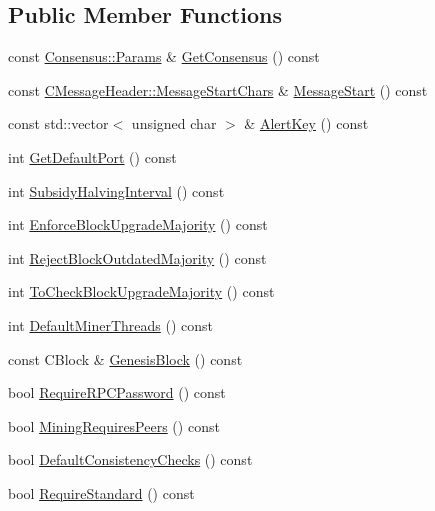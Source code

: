 \subsection*{Public Member Functions}
\begin{DoxyCompactItemize}
\item 
const \hyperlink{chainparams_8h_a5e1ca1b35c3dd1a4e20f18445f28dd9c}{Consensus\+::\+Params} \& \hyperlink{class_c_chain_params_a34b124f87e3b7864fec208ba8879e9e9}{Get\+Consensus} () const 
\item 
const \hyperlink{class_c_message_header_a0d0eeb540cbf4087973f6652ad61878f}{C\+Message\+Header\+::\+Message\+Start\+Chars} \& \hyperlink{class_c_chain_params_ae4f7e42b4fa574aad4e2688f574227da}{Message\+Start} () const 
\item 
const std\+::vector$<$ unsigned char $>$ \& \hyperlink{class_c_chain_params_aec4d2aa83f6fd444f68df1a92140075a}{Alert\+Key} () const 
\item 
int \hyperlink{class_c_chain_params_afdb7793273cdb87cc5fd75450eb2258b}{Get\+Default\+Port} () const 
\item 
int \hyperlink{class_c_chain_params_a22301443ebfa49c61f9a7d75b03a84f2}{Subsidy\+Halving\+Interval} () const 
\item 
int \hyperlink{class_c_chain_params_a11c62c3c053019d7c10034d7690d4311}{Enforce\+Block\+Upgrade\+Majority} () const 
\item 
int \hyperlink{class_c_chain_params_ac30ca8a722c96c7d7894637b409bf32a}{Reject\+Block\+Outdated\+Majority} () const 
\item 
int \hyperlink{class_c_chain_params_ae7c61aab594b025befa97accf28e7324}{To\+Check\+Block\+Upgrade\+Majority} () const 
\item 
int \hyperlink{class_c_chain_params_a6dd15e60d45273fef82c7ca435b1c1e9}{Default\+Miner\+Threads} () const 
\item 
const C\+Block \& \hyperlink{class_c_chain_params_a93e04059986f1b0ad673304260176956}{Genesis\+Block} () const 
\item 
bool \hyperlink{class_c_chain_params_ad4063a9056a4e87f471e671ab8e7e6c9}{Require\+R\+P\+C\+Password} () const 
\item 
bool \hyperlink{class_c_chain_params_a0afe61c7b66dcdc88a7c4ad39a64562d}{Mining\+Requires\+Peers} () const 
\item 
bool \hyperlink{class_c_chain_params_ac821d208a2c8c3e1713f206eacfc7adc}{Default\+Consistency\+Checks} () const 
\item 
bool \hyperlink{class_c_chain_params_aab181655e60d8b6ca2097b4f5e5e38c5}{Require\+Standard} () const 

\end{DoxyCompactItemize}
